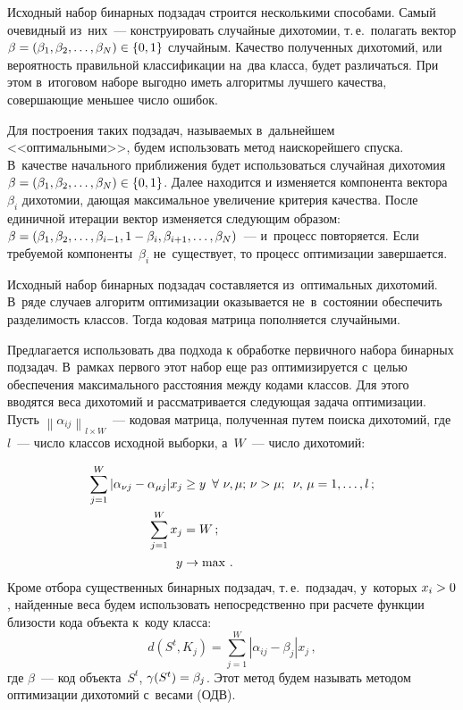 \begin{multicols}{2}
Исходный набор бинарных подзадач строится несколькими способами.
Самый очевидный из~них~--- конструировать случайные дихотомии, т.\,е.\
 полагать вектор $\beta \hm=(\beta_{1} ,\beta_{2},\ldots,\beta_{N})
 \hm\in \{ 0,1\}$ случайным.
Качество полученных дихотомий, или вероятность правильной классификации на~два 
класса, будет различаться.
При этом в~итоговом наборе выгодно иметь алгоритмы лучшего качества, 
совершающие меньшее число ошибок.

Для построения таких подзадач, называемых в~дальнейшем <<оптимальными>>, 
будем использовать метод наискорейшего спуска.
В~качестве начального приближения будет использоваться случайная дихотомия 
$\beta \hm=(\beta _{1} ,\beta _{2} ,\ldots,\beta _{N} )\in \{ 0,1\}$.\linebreak
Далее находится и изменяется компонента век\-тора~$\beta _{i}$ дихотомии, 
дающая максимальное увеличение критерия качества.
После единичной итерации вектор изменяется следующим образом:\linebreak 
$\beta \hm=(\beta_{1},\beta_{2},\ldots,\beta_{i-1}, 1-\beta_{i},
\beta_{i+1},\ldots,\beta_{N})$~--- и~процесс повторяется.
Если требуемой компоненты~$\beta_{i}$ не~существует, то процесс оптимизации 
заверша\-ется.

Исходный набор бинарных подзадач составляется из~оптимальных дихотомий.
В~ряде случаев алгоритм оптимизации оказывается не~в~состоянии обеспечить 
разделимость классов.
Тогда кодовая матрица пополняется случайными.

Предлагается использовать два подхода к обработке первичного набора
 бинарных подзадач.
В~рамках первого этот набор еще раз оптимизируется с~целью обеспечения 
максимального расстояния между кодами классов.
Для этого вводятся веса дихотомий и рассматривается следующая задача оптимизации.
Пусть ${\left\| \alpha _{ij} \right\|_{l \times W}}$~--- кодовая матрица, 
полученная путем поиска дихотомий, где $l$~--- число классов исходной выборки, 
а~$W$~--- число дихотомий:

\noindent
\begin{align*}
\sum\limits_{j = 1}^W {\left| \alpha _{\nu j} - \alpha _{\mu j} \right|} {x_j} &\ge y 
\enskip
 \forall\ \nu,\mu;\,\nu  > \mu;\enskip \nu,\,\mu  = 1,\ldots,l\,; \\
\sum\limits_{j = 1}^W {{x_j}} & = W\,; \\
y &\rightarrow  \max\,.
\end{align*}
Кроме отбора существенных бинарных подзадач, т.\,е.\
 подзадач, у~которых $x_i\hm>0$, найденные веса будем использовать непосредственно 
 при расчете функции близости кода объекта к~коду класса:
\begin{equation*}
d(S^t,K_j) = \sum\limits_{j = 1}^W {\left| {{\alpha _{i j}} - 
{\beta _{j}}} \right|} {x_j}\,,
\end{equation*}
где $\beta$~--- код объекта~$S^t$, $\gamma(S^t)\hm=\beta_j$.
Этот метод будем называть методом оптимизации дихотомий с~весами (ОДВ).


\end{multicols}
